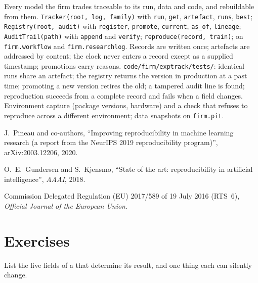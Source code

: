 \begin{build}
 Every model the firm trades traceable to its run, data and code, and rebuildable from them.
 \texttt{Tracker(root, log, family)} with \texttt{run}, \texttt{get}, \texttt{artefact}, \texttt{runs},
\texttt{best}; \texttt{Registry(root, audit)} with \texttt{register}, \texttt{promote}, \texttt{current}, \texttt{as\_of},
\texttt{lineage}; \texttt{AuditTrail(path)} with \texttt{append} and \texttt{verify}; \texttt{reproduce(record, train)}; on
\texttt{firm.workflow} and \texttt{firm.researchlog}.
 Records are written once; artefacts are addressed by content; the clock never enters a record except as a
supplied timestamp; promotions carry reasons.
 \texttt{code/firm/exptrack/tests/}: identical runs share an artefact; the registry returns the version
in production at a past time; promoting a new version retires the old; a tampered audit line is found; reproduction succeeds
from a complete record and fails when a field changes.
 Environment capture (package versions, hardware) and a check that refuses to reproduce across a different
environment; data snapshots on \texttt{firm.pit}.
\end{build}

\begin{omsources}
\item J.~Pineau and co-authors, ``Improving reproducibility in machine learning research (a report from the NeurIPS 2019
reproducibility program)'', arXiv:2003.12206, 2020.
\item O.~E.~Gundersen and S.~Kjensmo, ``State of the art: reproducibility in artificial intelligence'', \emph{AAAI}, 2018.
\item Commission Delegated Regulation (EU) 2017/589 of 19 July 2016 (RTS~6), \emph{Official Journal of the European Union}.
\end{omsources}

\section{Exercises}

\begin{exercise}[$\star$]\label{exo:ml:experiment-tracking-and-reproducibility:1}
List the five fields of a  that determine its result, and one thing each can silently change.
\end{exercise}

